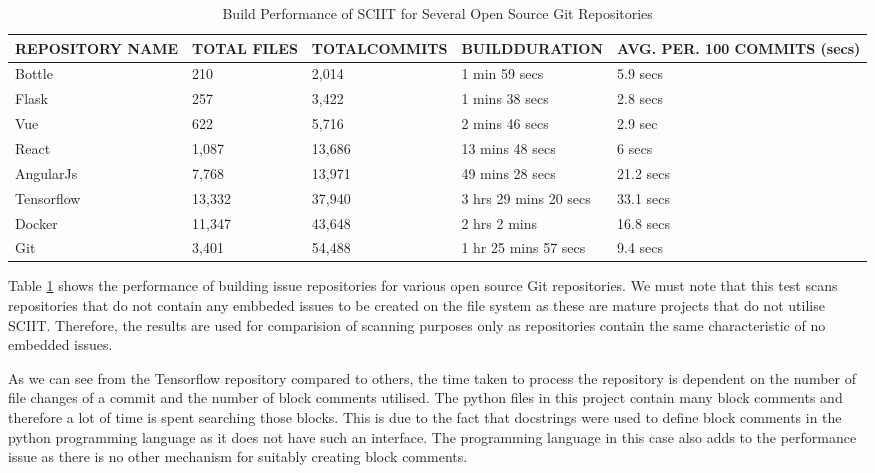 \documentclass{mproj}
\begin{document}
\begin{table}[h!]
\centering
  \caption{Build Performance of SCIIT for Several Open Source Git Repositories}
  \label{table:build-performance}
  \begin{tabular}{ | p{2.5cm} | p{2.5cm} | p{2.5cm} | p{2.5cm} | p{2.5cm} | }

    \hline
    \textbf{REPOSITORY NAME} & \textbf{TOTAL FILES} & \textbf{TOTAL\newline COMMITS} & \textbf{BUILD\newline DURATION}  & \textbf{AVG. PER. 100 COMMITS (secs)} \\ \hline
    Bottle & 210 & 2,014 & 1 min 59 secs & 5.9 secs \\ \hline
    Flask & 257 & 3,422 & 1 mins 38 secs & 2.8 secs \\ \hline
    Vue & 622 & 5,716 & 2 mins 46 secs & 2.9 sec \\ \hline
    React & 1,087 & 13,686 & 13 mins 48 secs & 6 secs \\ \hline
    AngularJs & 7,768 & 13,971 &  49 mins 28 secs & 21.2 secs \\ \hline
    Tensorflow & 13,332 & 37,940 & 3 hrs 29 mins 20 secs & 33.1 secs \\ \hline
    Docker & 11,347 & 43,648 & 2 hrs 2 mins & 16.8 secs \\ \hline
    Git & 3,401 & 54,488 & 1 hr 25 mins 57 secs & 9.4 secs \\ \hline

  \end{tabular}
\end{table}

Table \ref{table:build-performance} shows the performance of building issue repositories for various open source Git repositories. We must note that this test scans repositories that do not contain any embbeded issues to be created on the file system as these are mature projects that do not utilise SCIIT. Therefore, the results are used for comparision of scanning purposes only as repositories contain the same characteristic of no embedded issues.

As we can see from the Tensorflow repository compared to others, the time taken to process the repository is dependent on the number of file changes of a commit and the number of block comments utilised. The python files in this project contain many block comments and therefore a lot of time is spent searching those blocks. This is due to the fact that docstrings were used to define block comments in the python programming language as it does not have such an interface. The programming language in this case also adds to the performance issue as there is no other mechanism for suitably creating block comments.
\end{document}
